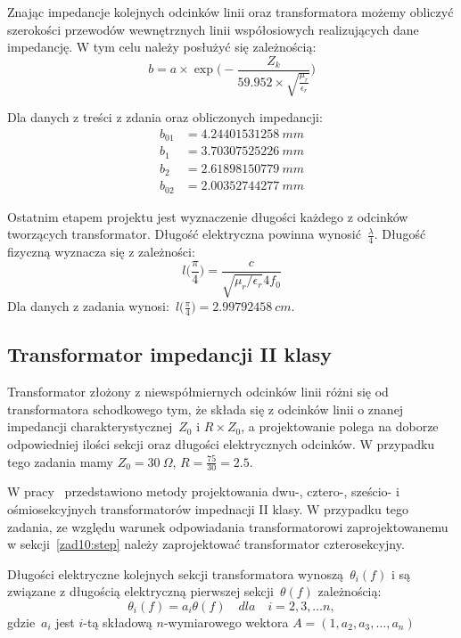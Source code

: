 \documentclass[rep.tex]{subfiles}
\begin{document}
Znając impedancje kolejnych odcinków linii oraz transformatora możemy obliczyć szerokości przewodów wewnętrznych linii współosiowych realizujących dane impedancję.
W tym celu należy posłużyć się zależnością:
\begin{equation}
  b = a \times \exp\Bigg(- \frac{Z_k}{59.952\times\sqrt{\frac{\mu_r}{\epsilon_r}}}\Bigg)
\end{equation}

Dla danych z treści z zdania oraz obliczonych impedancji:
\begin{align}
  b_{01} &= 4.24401531258~mm  \nonumber \\
  b_{1~} &= 3.70307525226~mm  \nonumber \\
  b_{2~} &= 2.61898150779~mm  \nonumber \\
  b_{02} &= 2.00352744277~mm  \nonumber
\end{align}

Ostatnim etapem projektu jest wyznaczenie długości każdego z odcinków tworzących transformator.
Długość elektryczna powinna wynosić~$\frac{\lambda}{4}$.
Długość fizyczną wyznacza się z zależności:
\begin{equation}
  l\Big(\frac{\pi}{4}\Big) = \frac{c}{\sqrt{\mu_r/\epsilon_r}4f_0}
\end{equation}
Dla danych z zadania wynosi:~$l\Big(\frac{\pi}{4}\Big) = 2.99792458~cm$.

\subsection{Transformator impedancji II klasy}
Transformator złożony z niewspółmiernych odcinków linii różni się od transformatora schodkowego tym,
że składa się z odcinków linii o znanej impedancji charakterystycznej~$Z_0$ i $R\times Z_0$,
a projektowanie polega na doborze odpowiedniej ilości sekcji oraz długości elektrycznych odcinków.
W przypadku tego zadania mamy $Z_0 = 30~\Omega$, $R = \frac{75}{30} = 2.5$.

W pracy~\cite{obwody} przedstawiono metody projektowania dwu-, cztero-, sześcio- i ośmiosekcyjnych transformatorów impednacji II klasy.
W przypadku tego zadania, ze względu warunek odpowiadania transformatorowi zaprojektowanemu w sekcji~\ref{zad10:step} należy zaprojektować transformator czterosekcyjny.

Długości elektryczne kolejnych sekcji transformatora wynoszą~$\theta_i(f)$ i są związane z długością elektryczną pierwszej sekcji~$\theta(f)$ zależnością:
\begin{equation}
  \theta_i(f) = a_i\theta(f) \quad dla \quad i = 2, 3, \ldots n,
\end{equation}
gdzie~$a_i$ jest $i$-tą składową $n$-wymiarowego wektora $A = (1, a_2, a_3, \ldots, a_n)$
\end{document}
